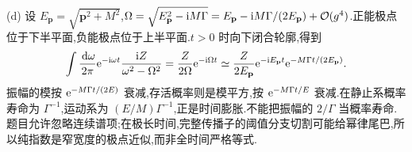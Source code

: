 \begin{solution}
(d) 设 $E_{\mathbf p}=\sqrt{\mathbf p^2+M^2}$,$\Omega=\sqrt{E_{\mathbf p}^2-\mathrm i M\Gamma}=E_{\mathbf p}-\mathrm i M\Gamma/(2E_{\mathbf p})+\mathcal O(g^4)$.正能极点位于下半平面,负能极点位于上半平面.$t>0$ 时向下闭合轮廓,得到
\[
\int\frac{\,\mathrm d\omega}{2\pi}\mathrm e^{-\mathrm i\omega t}
\frac{\mathrm i Z}{\omega^2-\Omega^2}
=\frac{Z}{2\Omega}\mathrm e^{-\mathrm i\Omega t}
\simeq\frac{Z}{2E_{\mathbf p}}\mathrm e^{-\mathrm i E_{\mathbf p}t}
\mathrm e^{-M\Gamma t/(2E_{\mathbf p})}.
\]
振幅的模按 $\mathrm e^{-M\Gamma t/(2E)}$ 衰减,存活概率则是模平方,按 $\mathrm e^{-M\Gamma t/E}$ 衰减.在静止系概率寿命为 $\Gamma^{-1}$,运动系为 $(E/M)\Gamma^{-1}$,正是时间膨胀.不能把振幅的 $2/\Gamma$ 当概率寿命.题目允许忽略连续谱项;在极长时间,完整传播子的阈值分支切割可能给幂律尾巴,所以纯指数是窄宽度的极点近似,而非全时间严格等式.
\end{solution}
